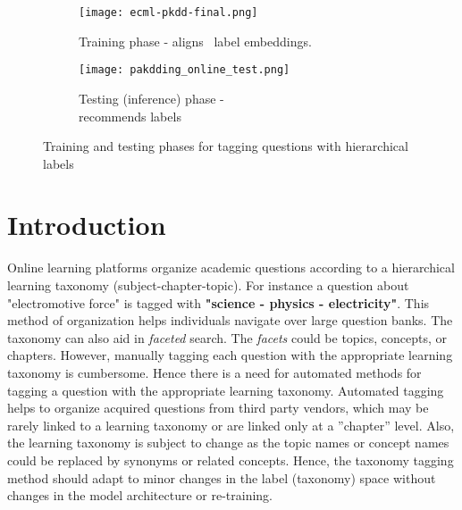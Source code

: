 \documentclass[runningheads, envcountsame, a4paper]{llncs}
\begin{document}
\begin{figure*}
\captionsetup{justification=centering}

\begin{subfigure}[t]{0.59\linewidth}
\texttt{[image: ecml-pkdd-final.png]}
\caption{Training phase - aligns \ label embeddings. }
\end{subfigure}\hspace{2em}
\begin{subfigure}[t]{0.48\linewidth}
\texttt{[image: pakdding\_online\_test.png]}
\caption{Testing (inference) phase - \\ recommends labels}
\end{subfigure}\caption{Training and testing phases for tagging questions with hierarchical labels}
\end{figure*}
\section{Introduction}
Online learning platforms organize academic questions according to a hierarchical learning taxonomy (subject-chapter-topic). For instance a question about "electromotive force"  is tagged with \textbf{"science - physics - electricity"}. This method of organization helps individuals navigate over large question banks. The taxonomy can also aid in \textit{faceted} search. The \textit{facets} could be topics, concepts, or chapters. However, manually tagging each question with the appropriate learning taxonomy is cumbersome. Hence there is a need for automated methods for tagging a question with the appropriate learning taxonomy. Automated tagging helps to organize acquired questions from third party vendors, which may be rarely linked to a learning taxonomy or are linked only at a ”chapter” level. Also, the learning taxonomy is subject to change as the topic names or concept names could be replaced by synonyms or related concepts. Hence, the taxonomy tagging method should adapt to minor changes in the label (taxonomy) space without changes in the model architecture or re-training.
\end{document}
